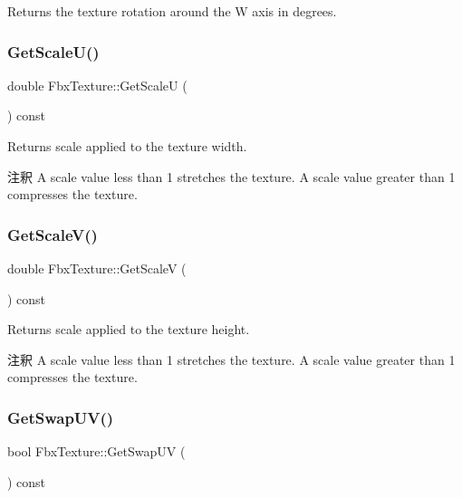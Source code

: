 Returns the texture rotation around the W axis in degrees. 

\mbox{\label{class_fbx_texture_a2ca0428f36ddd73442891a73c15e4227}} 
\subsubsection{\texorpdfstring{Get\+Scale\+U()}{GetScaleU()}}
{\footnotesize\ttfamily double Fbx\+Texture\+::\+Get\+ScaleU (\begin{DoxyParamCaption}{ }\end{DoxyParamCaption}) const}

Returns scale applied to the texture width. \begin{DoxyRemark}{注釈}
A scale value less than 1 stretches the texture. A scale value greater than 1 compresses the texture. 
\end{DoxyRemark}
\mbox{\label{class_fbx_texture_a37edad25de26090cde868b88b9e89a77}} 
\subsubsection{\texorpdfstring{Get\+Scale\+V()}{GetScaleV()}}
{\footnotesize\ttfamily double Fbx\+Texture\+::\+Get\+ScaleV (\begin{DoxyParamCaption}{ }\end{DoxyParamCaption}) const}

Returns scale applied to the texture height. \begin{DoxyRemark}{注釈}
A scale value less than 1 stretches the texture. A scale value greater than 1 compresses the texture. 
\end{DoxyRemark}
\mbox{\label{class_fbx_texture_ac73ac8fda4d8e4e31c829ffb6838fcad}} 
\subsubsection{\texorpdfstring{Get\+Swap\+U\+V()}{GetSwapUV()}}
{\footnotesize\ttfamily bool Fbx\+Texture\+::\+Get\+Swap\+UV (\begin{DoxyParamCaption}{ }\end{DoxyParamCaption}) const}

